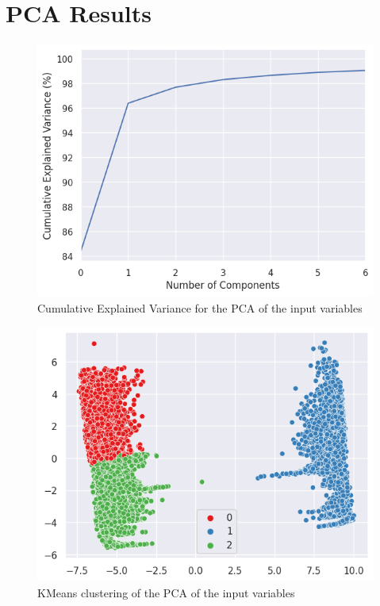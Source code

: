 \section{PCA Results}
\begin{figure}[h]
    \centering
    \includegraphics[width=\textwidth]{figures/join_pca_variance.png}
    \caption{Cumulative Explained Variance for the PCA of the input variables}
    \label{fig_a:cumulative_var_join}
\end{figure}


\begin{figure}[]
    \centering
    \includegraphics[width=\textwidth]{figures/kmeans_joint_pca_3.png}
    \caption{KMeans clustering of the PCA of the input variables}
    \label{fig_a:kmean_joint_2d}
\end{figure}


